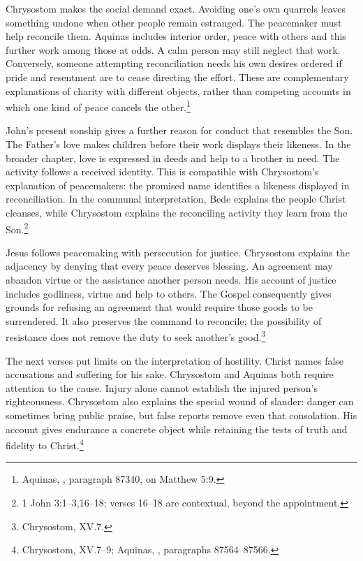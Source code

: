 Chrysostom makes the social demand exact. Avoiding one's own quarrels leaves something undone when other people remain estranged. The peacemaker must help reconcile them. Aquinas includes interior order, peace with others and this further work among those at odds. A calm person may still neglect that work. Conversely, someone attempting reconciliation needs his own desires ordered if pride and resentment are to cease directing the effort. These are complementary explanations of charity with different objects, rather than competing accounts in which one kind of peace cancels the other.\footnote{Aquinas, , paragraph 87340, on Matthew 5:9.}

John's present sonship gives a further reason for conduct that resembles the Son. The Father's love makes children before their work displays their likeness. In the broader chapter, love is expressed in deeds and help to a brother in need. The activity follows a received identity. This is compatible with Chrysostom's explanation of peacemakers: the promised name identifies a likeness displayed in reconciliation. In the communal interpretation, Bede explains the people Christ cleanses, while Chrysostom explains the reconciling activity they learn from the Son.\footnote{1 John 3:1--3,16--18; verses 16--18 are contextual, beyond the appointment.}

Jesus follows peacemaking with persecution for justice. Chrysostom explains the adjacency by denying that every peace deserves blessing. An agreement may abandon virtue or the assistance another person needs. His account of justice includes godliness, virtue and help to others. The Gospel consequently gives grounds for refusing an agreement that would require those goods to be surrendered. It also preserves the command to reconcile; the possibility of resistance does not remove the duty to seek another's good.\footnote{Chrysostom,  XV.7.}

The next verses put limits on the interpretation of hostility. Christ names false accusations and suffering for his sake. Chrysostom and Aquinas both require attention to the cause. Injury alone cannot establish the injured person's righteousness. Chrysostom also explains the special wound of slander: danger can sometimes bring public praise, but false reports remove even that consolation. His account gives endurance a concrete object while retaining the tests of truth and fidelity to Christ.\footnote{Chrysostom,  XV.7--9; Aquinas, , paragraphs 87564--87566.}

